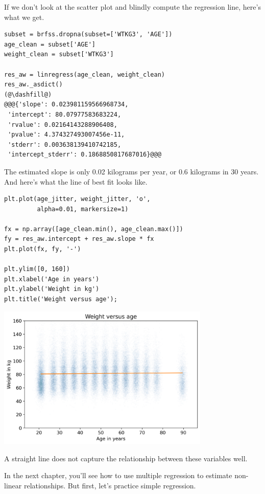 If we don't look at the scatter plot and blindly compute the regression
line, here's what we get.

\begin{lstlisting}[]
subset = brfss.dropna(subset=['WTKG3', 'AGE'])
age_clean = subset['AGE']
weight_clean = subset['WTKG3']

res_aw = linregress(age_clean, weight_clean)
res_aw._asdict()
(@\dashfill@)
@@@{'slope': 0.023981159566968734,
 'intercept': 80.07977583683224,
 'rvalue': 0.02164143288906408,
 'pvalue': 4.374327493007456e-11,
 'stderr': 0.003638139410742185,
 'intercept_stderr': 0.1868850817687016}@@@
\end{lstlisting}

The estimated slope is only 0.02 kilograms per year, or 0.6 kilograms in
30 years. And here's what the line of best fit looks like.

\begin{lstlisting}[]
plt.plot(age_jitter, weight_jitter, 'o', 
         alpha=0.01, markersize=1)

fx = np.array([age_clean.min(), age_clean.max()])
fy = res_aw.intercept + res_aw.slope * fx
plt.plot(fx, fy, '-')

plt.ylim([0, 160])
plt.xlabel('Age in years')
plt.ylabel('Weight in kg')
plt.title('Weight versus age');
\end{lstlisting}

\begin{center}
\includegraphics[width=4in]{chapters/09_relationships_files/09_relationships_106_0.png}
\end{center}

A straight line does not capture the relationship between these
variables well.

In the next chapter, you'll see how to use multiple regression to
estimate non-linear relationships. But first, let's practice simple
regression.

